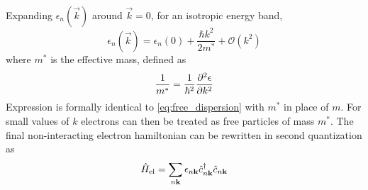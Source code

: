 Expanding $\epsilon_n(\vec{k})$ around $\vec{k} = 0$, for an isotropic energy band,
\begin{equation} \label{eq:effective_mass}
    \epsilon_n(\vec{k}) = \epsilon_n(0) + \frac{\hbar k^2}{2m^*} + \mathcal{O}(k^2)
\end{equation}
where $m^*$ is the effective mass, defined as
\begin{equation}
    \frac{1}{m^*} = \frac{1}{\hbar^2} \pdv[2]{\epsilon}{k}
\end{equation}
Expression  is formally identical to \cref{eq:free_dispersion} with $m^*$ in place of $m$. For small values of $k$ electrons can then be treated as free particles of mass $m^*$.
The final non-interacting electron hamiltonian can be rewritten in second quantization as
\begin{equation}
    \hat{H}_\text{el} = \sum_{n\mathbf{k}} \epsilon_{n\mathbf{k}} \hat{c}^\dagger_{n\mathbf{k}}\hat{c}_{n\mathbf{k}}
\end{equation}